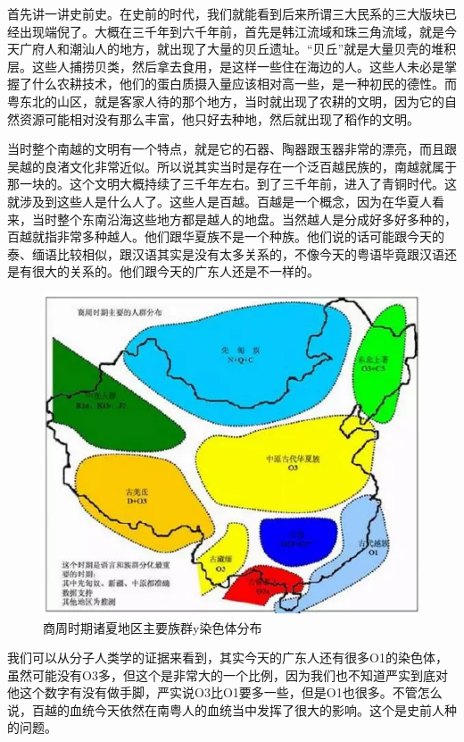 首先讲一讲史前史。在史前的时代，我们就能看到后来所谓三大民系的三大版块已经出现端倪了。大概在三千年到六千年前，首先是韩江流域和珠三角流域，就是今天广府人和潮汕人的地方，就出现了大量的贝丘遗址。“贝丘”就是大量贝壳的堆积层。这些人捕捞贝类，然后拿去食用，是这样一些住在海边的人。这些人未必是掌握了什么农耕技术，他们的蛋白质摄入量应该相对高一些，是一种初民的德性。而粤东北的山区，就是客家人待的那个地方，当时就出现了农耕的文明，因为它的自然资源可能相对没有那么丰富，他只好去种地，然后就出现了稻作的文明。

当时整个南越的文明有一个特点，就是它的石器、陶器跟玉器非常的漂亮，而且跟吴越的良渚文化非常近似。所以说其实当时是存在一个泛百越民族的，南越就属于那一块的。这个文明大概持续了三千年左右。到了三千年前，进入了青铜时代。这就涉及到这些人是什么人了。这些人是百越。百越是一个概念，因为在华夏人看来，当时整个东南沿海这些地方都是越人的地盘。当然越人是分成好多好多种的，百越就指非常多种越人。他们跟华夏族不是一个种族。他们说的话可能跟今天的泰、缅语比较相似，跟汉语其实是没有太多关系的，不像今天的粤语毕竟跟汉语还是有很大的关系的。他们跟今天的广东人还是不一样的。

\begin{figure}
	\centering
	\includegraphics[width=\textwidth]{images/image-4}
	\caption{商周时期诸夏地区主要族群y染色体分布}
\end{figure}

我们可以从分子人类学的证据来看到，其实今天的广东人还有很多O1的染色体，虽然可能没有O3多，但这个是非常大的一个比例，因为我们也不知道严实到底对他这个数字有没有做手脚，严实说O3比O1要多一些，但是O1也很多。不管怎么说，百越的血统今天依然在南粤人的血统当中发挥了很大的影响。这个是史前人种的问题。


